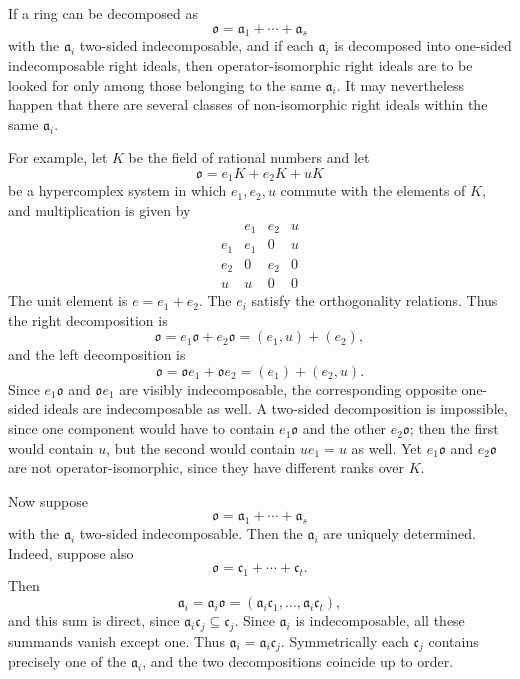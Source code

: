 \documentclass[11pt]{article}
\begin{document}
If a ring can be decomposed as \[
  \mathfrak{o}=\mathfrak a_1+\cdots+\mathfrak a_s
\] with the \(\mathfrak a_i\) two-sided indecomposable, and if each
\(\mathfrak a_i\) is decomposed into one-sided indecomposable right
ideals, then operator-isomorphic right ideals are to be looked for only
among those belonging to the same \(\mathfrak a_i\). It may nevertheless
happen that there are several classes of non-isomorphic right ideals
within the same \(\mathfrak a_i\).

For example, let \(K\) be the field of rational numbers and let \[
  \mathfrak{o}=e_1K+e_2K+uK
\] be a hypercomplex system in which \(e_1,e_2,u\) commute with the
elements of \(K\), and multiplication is given by \[
\begin{array}{c|ccc}
       & e_1&e_2&u\\ \hline
 e_1   & e_1&0&u\\
 e_2   & 0&e_2&0\\
 u     & u&0&0
\end{array}
\] The unit element is \(e=e_1+e_2\). The \(e_i\) satisfy the
orthogonality relations. Thus the right decomposition is \[
  \mathfrak{o}=e_1\mathfrak{o}+e_2\mathfrak{o}=(e_1,u)+(e_2),
\] and the left decomposition is \[
  \mathfrak{o}=\mathfrak{o}e_1+\mathfrak{o}e_2=(e_1)+(e_2,u).
\] Since \(e_1\mathfrak{o}\) and \(\mathfrak{o}e_1\) are visibly
indecomposable, the corresponding opposite one-sided ideals are
indecomposable as well. A two-sided decomposition is impossible, since
one component would have to contain \(e_1\mathfrak{o}\) and the other
\(e_2\mathfrak{o}\); then the first would contain \(u\), but the second
would contain \(ue_1=u\) as well. Yet \(e_1\mathfrak{o}\) and
\(e_2\mathfrak{o}\) are not operator-isomorphic, since they have
different ranks over \(K\).

Now suppose \[
  \mathfrak{o}=\mathfrak a_1+\cdots+\mathfrak a_s
\] with the \(\mathfrak a_i\) two-sided indecomposable. Then the
\(\mathfrak a_i\) are uniquely determined. Indeed, suppose also \[
  \mathfrak{o}=\mathfrak c_1+\cdots+\mathfrak c_t.
\] Then \[
  \mathfrak a_i=\mathfrak a_i\mathfrak{o}=(\mathfrak a_i\mathfrak c_1,\ldots,\mathfrak a_i\mathfrak c_t),
\] and this sum is direct, since
\(\mathfrak a_i\mathfrak c_j\subseteq \mathfrak c_j\). Since
\(\mathfrak a_i\) is indecomposable, all these summands vanish except
one. Thus \(\mathfrak a_i=\mathfrak a_i\mathfrak c_j\). Symmetrically
each \(\mathfrak c_j\) contains precisely one of the \(\mathfrak a_i\),
and the two decompositions coincide up to order.
\end{document}
